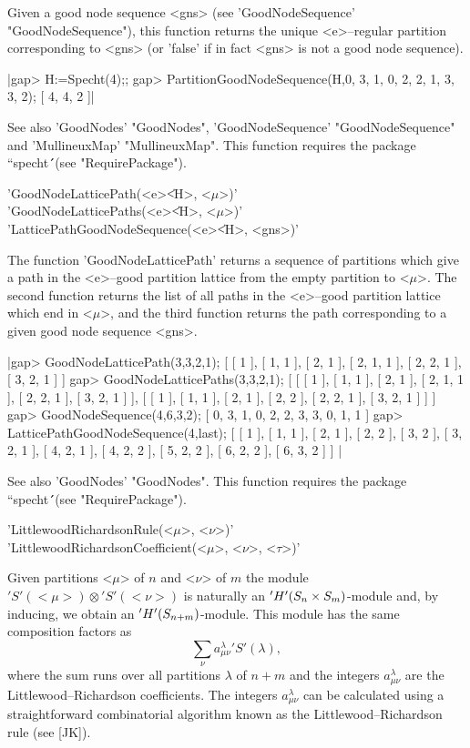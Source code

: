 Given a good node sequence <gns> (see 'GoodNodeSequence' 
"GoodNodeSequence"), this function returns the unique <e>--regular 
partition corresponding to <gns> (or 'false' if in fact <gns> is not a 
good node sequence).

|gap> H:=Specht(4);; 
gap> PartitionGoodNodeSequence(H,0, 3, 1, 0, 2, 2, 1, 3, 3, 2);
[ 4, 4, 2 ]|

See also 'GoodNodes' "GoodNodes", 'GoodNodeSequence' "GoodNodeSequence"
and 'MullineuxMap' "MullineuxMap". This function requires the package 
``specht\'\'\ (see "RequirePackage").


 
 
'GoodNodeLatticePath(<e>\|<H>, <$\mu$>)' \\
'GoodNodeLatticePaths(<e>\|<H>, <$\mu$>)' \\
'LatticePathGoodNodeSequence(<e>\|<H>, <gns>)'

The function 'GoodNodeLatticePath' returns a sequence of partitions which 
give a path in the <e>--good partition lattice from the empty partition 
to <$\mu$>. The second function returns the list of all paths in the 
<e>--good partition lattice which end in <$\mu$>, and the third function 
returns the path corresponding to a given good node sequence <gns>.

|gap> GoodNodeLatticePath(3,3,2,1);
[ [ 1 ], [ 1, 1 ], [ 2, 1 ], [ 2, 1, 1 ], [ 2, 2, 1 ], [ 3, 2, 1 ] ]
gap> GoodNodeLatticePaths(3,3,2,1);
[ [ [ 1 ], [ 1, 1 ], [ 2, 1 ], [ 2, 1, 1 ], [ 2, 2, 1 ], [ 3, 2, 1 ] ], 
  [ [ 1 ], [ 1, 1 ], [ 2, 1 ], [ 2, 2 ], [ 2, 2, 1 ], [ 3, 2, 1 ] ] ]
gap> GoodNodeSequence(4,6,3,2);
[ 0, 3, 1, 0, 2, 2, 3, 3, 0, 1, 1 ]
gap> LatticePathGoodNodeSequence(4,last);
[ [ 1 ], [ 1, 1 ], [ 2, 1 ], [ 2, 2 ], [ 3, 2 ], [ 3, 2, 1 ], [ 4, 2, 1 ], 
  [ 4, 2, 2 ], [ 5, 2, 2 ], [ 6, 2, 2 ], [ 6, 3, 2 ] ] |

See also 'GoodNodes' "GoodNodes". This function requires the package
``specht\'\'\ (see "RequirePackage").


'LittlewoodRichardsonRule(<$\mu$>, <$\nu$>)'\\
'LittlewoodRichardsonCoefficient(<$\mu$>, <$\nu$>, <$\tau$>)'

Given partitions <$\mu$> of $n$ and <$\nu$> of $m$ the module
$'S'(<\mu>)\otimes'S'(<\nu>)$ is naturally an 
$'H'(S_n\times S_m)$-module and, by inducing, we obtain an 
$'H'(S_{n+m})$-module. This module has the same composition factors as 
       $$\sum_{\nu} a_{\mu\nu}^\lambda 'S'(\lambda),$$
where the sum runs over all partitions $\lambda$ of $n+m$ and the integers
$a_{\mu\nu}^\lambda$ are the Littlewood--Richardson coefficients. The
integers $a_{\mu\nu}^\lambda$ can be calculated using a straightforward 
combinatorial algorithm known as the Littlewood--Richardson rule 
(see [JK]).

